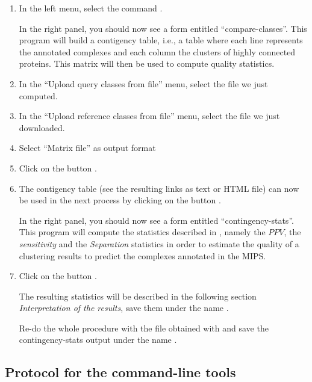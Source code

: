 \begin{enumerate}

\item In the \neat left menu, select the command . 

  In the right panel, you should now see a form entitled
  ``compare-classes''. This program will build a contigency table, i.e., a table where each line represents
  the annotated complexes and each column the clusters of highly connected proteins. This matrix will then be used to 
  compute quality statistics.
  
\item In the ``Upload query classes from file'' menu, select the file  we just computed.
\item In the ``Upload reference classes from file'' menu, select the file  we just downloaded.
\item Select ``Matrix file'' as output format
\item Click on the button . 
\item The contigency table (see the resulting links as text or HTML file) can now be used in the next process by clicking on the button
.

  In the right panel, you should now see a form entitled
  ``contingency-stats''. This program will compute the statistics described in \cite{Brohee2006}, namely the $PPV$, the \textit{sensitivity} and the \textit{Separation} statistics in order 
  to estimate the quality of a clustering results to predict the complexes annotated in the MIPS. 

\item Click on the button .

The resulting statistics will be described in the following section \textit{Interpretation of the results}, save them under the name . 

Re-do the whole procedure with the file obtained with  and save the contingency-stats output under the name . 

\end{enumerate}

\subsection{Protocol for the command-line tools}

